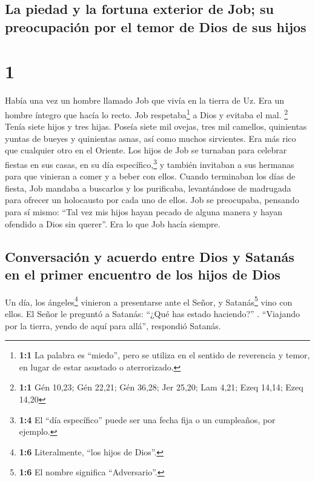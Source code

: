 \hypertarget{la-piedad-y-la-fortuna-exterior-de-job-su-preocupaciuxf3n-por-el-temor-de-dios-de-sus-hijos}{%
\subsection{La piedad y la fortuna exterior de Job; su preocupación por
el temor de Dios de sus
hijos}\label{la-piedad-y-la-fortuna-exterior-de-job-su-preocupaciuxf3n-por-el-temor-de-dios-de-sus-hijos}}

\hypertarget{section}{%
\section{1}\label{section}}

 Había una vez un hombre llamado Job que vivía en la
tierra de Uz. Era un hombre íntegro que hacía lo recto. Job
respetaba\footnote{\textbf{1:1} La palabra es ``miedo'', pero se utiliza
  en el sentido de reverencia y temor, en lugar de estar asustado o
  aterrorizado.} a Dios y evitaba el mal. \footnote{\textbf{1:1} Gén
  10,23; Gén 22,21; Gén 36,28; Jer 25,20; Lam 4,21; Ezeq 14,14; Ezeq
  14,20}  Tenía siete hijos y tres hijas. 
Poseía siete mil ovejas, tres mil camellos, quinientas yuntas de bueyes
y quinientas asnas, así como muchos sirvientes. Era más rico que
cualquier otro en el Oriente.  Los hijos de Job se
turnaban para celebrar fiestas en sus casas, en su día
específico,\footnote{\textbf{1:4} El ``día específico'' puede ser una
  fecha fija o un cumpleaños, por ejemplo.} y también invitaban a sus
hermanas para que vinieran a comer y a beber con ellos. 
Cuando terminaban los días de fiesta, Job mandaba a buscarlos y los
purificaba, levantándose de madrugada para ofrecer un holocausto por
cada uno de ellos. Job se preocupaba, pensando para sí mismo: ``Tal vez
mis hijos hayan pecado de alguna manera y hayan ofendido a Dios sin
querer''. Era lo que Job hacía siempre.

\hypertarget{conversaciuxf3n-y-acuerdo-entre-dios-y-satanuxe1s-en-el-primer-encuentro-de-los-hijos-de-dios}{%
\subsection{Conversación y acuerdo entre Dios y Satanás en el primer
encuentro de los hijos de
Dios}\label{conversaciuxf3n-y-acuerdo-entre-dios-y-satanuxe1s-en-el-primer-encuentro-de-los-hijos-de-dios}}

 Un día, los ángeles\footnote{\textbf{1:6} Literalmente,
  ``los hijos de Dios''.} vinieron a presentarse ante el Señor, y
Satanás\footnote{\textbf{1:6} El nombre significa ``Adversario''.} vino
con ellos.  El Señor le preguntó a Satanás: ``¿Qué has
estado haciendo?'' . ``Viajando por la tierra, yendo de aquí para
allá'', respondió Satanás.

